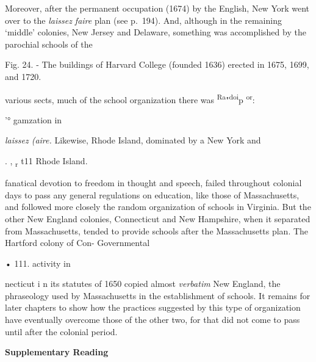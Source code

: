 \documentclass[]{book}
\begin{document}
Moreover, after the permanent occupation (1674) by the English, New York went over to the \emph{laissez faire} plan (see p.~194). And, although in the remaining `middle' colonies, New Jersey and Delaware, something was accomplished by the parochial schools of the

Fig. 24. - The buildings of Harvard College (founded 1636) erected in 1675, 1699, and 1720.

various sects, much of the school organization there was \textsuperscript{Ra}"\textsuperscript{doi}p \textsuperscript{or}:

'° gamzation in

\emph{laissez (aire.} Likewise, Rhode Island, dominated by a New York and

. , \textsubscript{r} t11 Rhode Island.

fanatical devotion to freedom in thought and speech, failed throughout colonial days to pass any general regulations on education, like those of Massachusetts, and followed more closely the random organization of schools in Virginia. But the other New England colonies, Connecticut and New Hampshire, when it separated from Massachusetts, tended to provide schools after the Massachusetts plan. The Hartford colony of Con- Governmental

• 111. activity in

necticut i n its statutes of 1650 copied almost \emph{verbatim} New England, the phraseology used by Massachusetts in the establishment of schools. It remains for later chapters to show how the practices suggested by this type of organization have eventually overcome those of the other two, for that did not come to pass until after the colonial period.

\textbf{Supplementary Reading}
\end{document}
